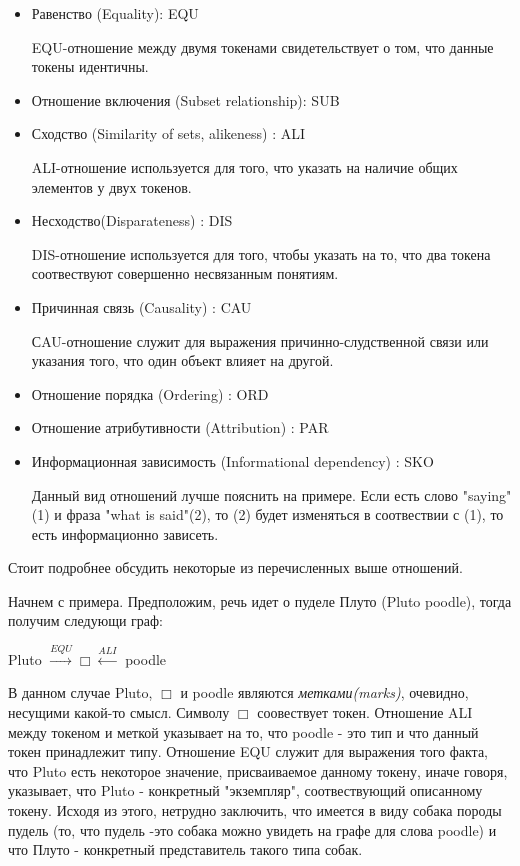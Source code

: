 \begin{itemize}

\item{
Равенство (Equality): EQU

EQU-отношение между двумя токенами свидетельствует о том, 
что данные токены идентичны.
}

\item {
Отношение включения (Subset relationship): SUB

}

\item{
Сходство (Similarity of sets, alikeness) : ALI

ALI-отношение используется для того, что указать на наличие общих
элементов у двух токенов.
}

\item{
Несходство(Disparateness) : DIS

DIS-отношение используется для того, чтобы указать на то, что
два токена соотвествуют совершенно несвязанным понятиям.
}

\item{
Причинная связь (Causality) : CAU

СAU-отношение служит для выражения причинно-слудственной связи или
указания того, что один объект влияет на другой. 
}

\item{
Отношение порядка (Ordering) : ORD  
}

\item{
Отношение атрибутивности (Attribution) : PAR
}

\item{
Информационная зависимость (Informational dependency) : SKO

Данный вид отношений лучше пояснить на примере. Если есть слово "saying"(1)
и фраза "what is said"(2), то (2) будет изменяться в соотвествии с (1), то есть
информационно зависеть.
}
\end{itemize}

Стоит подробнее обсудить некоторые из перечисленных выше отношений. 

Начнем с примера. Предположим, речь идет о пуделе Плуто (Pluto poodle),
 тогда получим следующи граф:

Pluto $\xrightarrow{EQU} \Box \xleftarrow{ALI}$ poodle 

В данном случае Pluto, $\Box$ и poodle являются \textsl{метками(marks)}, очевидно, несущими 
какой-то смысл. Символу $\Box$ соовествует токен. Отношение ALI между токеном и меткой указывает
на то, что poodle - это тип и что данный токен принадлежит типу. Отношение EQU служит для выражения
того факта, что Pluto есть некоторое значение, присваиваемое данному токену, иначе говоря, указывает,
что Pluto - конкретный "экземпляр", соотвествующий описанному токену. Исходя из этого, нетрудно заключить,
что имеется в виду собака породы пудель (то, что пудель -это собака можно увидеть на графе для слова
 poodle) и что Плуто - конкретный представитель такого типа собак.

